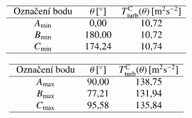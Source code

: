 \begin{minipage}{\textwidth}
	\hspace{-3mm}
	\begin{minipage}[b]{0.4\textwidth}
		\bgroup
		\setlength\tabcolsep{3mm}
		\def\arraystretch{1.7}%
		$$
		\begin{array}{ccc}
		\hline \text { Označení bodu } & \theta \, [^{\circ}] & T^{\text{C}}_{\text{turb}} (\theta) \, [\text{m}^{2} \text{s}^{-2}] \\
		\hline
		A_{\min} & 0{,}00 & 10{,}72 \\
		B_{\min} & 180{,}00 & 10{,}72 \\
		C_{\min} & 174{,}24 & 10{,}74 \\
		\hline
		\end{array}
		$$
		\egroup
	\end{minipage}%
	\begin{minipage}[b]{0.16\textwidth}
	\centering
	\hspace{-4mm}
	\end{minipage}%
	\begin{minipage}[b]{0.4\textwidth}
		\bgroup
		\setlength\tabcolsep{3mm}
		\def\arraystretch{1.7}%
		$$
		\begin{array}{ccc}
		\hline \text { Označení bodu } & \theta \, [^{\circ}] & T^{\text{C}}_{\text{turb}} (\theta) \, [\text{m}^{2} \text{s}^{-2}] \\
		\hline
		A_{\max} & 90{,}00 & 138{,}75 \\
		B_{\max} & 77{,}21 & 131{,}94 \\
		C_{\max} & 95{,}58 & 135{,}84 \\
		\hline
		\end{array}
		$$
		\egroup
	\end{minipage}
\vspace{4mm}
    \hfill
\end{minipage}

